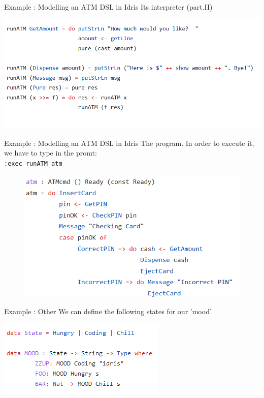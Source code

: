 \documentclass{beamer}
\newcommand{\dsltitle}{Example : Modelling an ATM DSL in Idris}
\newcommand{\othertitle}{Example : Other}
\begin{document}
\begin{frame}[fragile]{\dsltitle}
Its interpreter (part.II)
\begin{center}
	\includegraphics[width=\textwidth]{pics/dsl-code-4_2}
\end{center}
\end{frame}

\begin{frame}[fragile]{\dsltitle}
The program. In order to execute it, we have to type in the promt:\\
\texttt{:exec runATM atm}
\begin{figure}
	\raggedright
  \includegraphics[scale=0.5]{pics/dsl-code-5}
\end{figure}
\end{frame}

\begin{frame}[fragile]{\othertitle}
We can define the following states for our 'mood'
\begin{center}
	\includegraphics[scale=0.8]{pics/random-code-1}
\end{center}
\end{frame}
\end{document}
